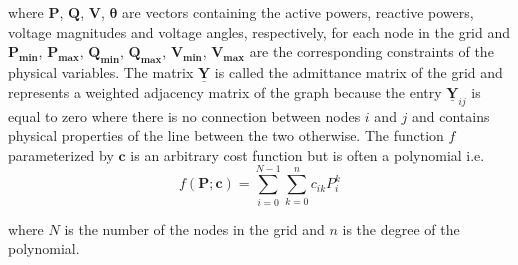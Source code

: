\noindent where $\boldsymbol{P}$, $\boldsymbol{Q}$, $\boldsymbol{V}$, $\boldsymbol{\theta}$ are vectors containing the active powers, reactive powers, voltage magnitudes and voltage angles, respectively, for each node in the grid and  $\boldsymbol{P_{min}}$, $\boldsymbol{P_{max}}$, $\boldsymbol{Q_{min}}$, $\boldsymbol{Q_{max}}$, $\boldsymbol{V_{min}}$, $\boldsymbol{V_{max}}$ are the corresponding constraints of the physical variables. The matrix $\boldsymbol{\underline{Y}}$ is called the admittance matrix of the grid and represents a weighted adjacency matrix of the graph because the entry $\boldsymbol{\underline{Y}}_{ij}$ is equal to zero where there is no connection between nodes $i$ and $j$ and contains physical properties of the line between the two otherwise. The function $f$ parameterized by $\boldsymbol{c}$ is an arbitrary cost function but is often a polynomial i.e. $$f(\boldsymbol{P}; \boldsymbol{c}) = \sum_{i=0}^{N - 1} \sum_{k=0}^n c_{ik}P_i^k$$

\noindent where $N$ is the number of the nodes in the grid and $n$ is the degree of the polynomial.